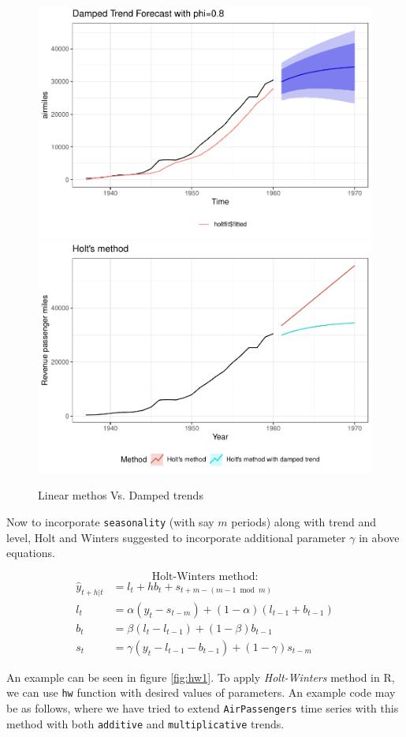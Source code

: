 \documentclass[
]{book}
\begin{document}
\begin{figure}

{\centering \includegraphics[width=0.49\linewidth]{DauR_files/figure-latex/hl2-1} \includegraphics[width=0.49\linewidth]{DauR_files/figure-latex/hl2-2} 

}

\caption{Linear methos Vs. Damped trends}\label{fig:hl2}
\end{figure}

Now to incorporate \texttt{seasonality} (with say \(m\) periods) along with trend and level, Holt and Winters suggested to incorporate additional parameter \(\gamma\) in above equations.

\[
\text{Holt-Winters method:}
\]
\[
\begin{aligned}
\hat{y}_{t+h|t} &= l_t + hb_t + s_{t+m-(m-1 \bmod m)} \\
l_t &= \alpha(y_t - s_{t-m}) + (1-\alpha)(l_{t-1} + b_{t-1}) \\
b_t &= \beta(l_t - l_{t-1}) + (1-\beta)b_{t-1} \\
s_t &= \gamma(y_t - l_{t-1} - b_{t-1}) + (1-\gamma)s_{t-m}
\end{aligned}
\]

An example can be seen in figure \ref{fig:hw1}. To apply \emph{Holt-Winters} method in R, we can use \texttt{hw} function with desired values of parameters. An example code may be as follows, where we have tried to extend \texttt{AirPassengers} time series with this method with both \texttt{additive} and \texttt{multiplicative} trends.
\end{document}
